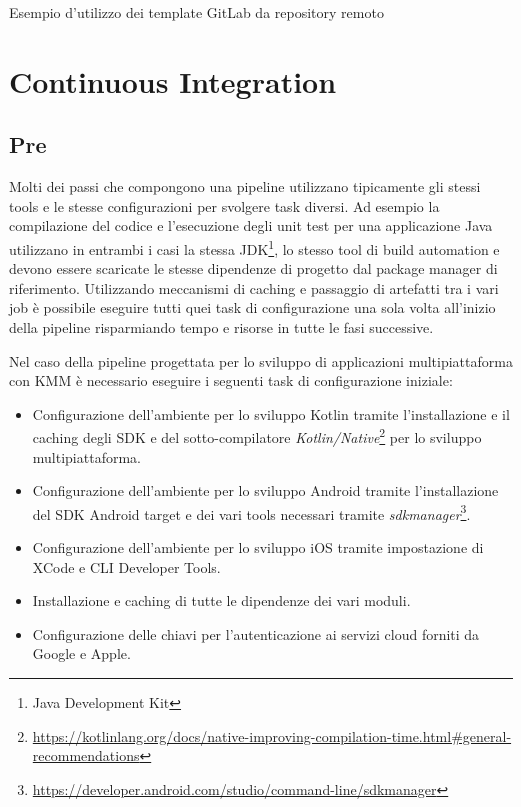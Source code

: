 \begin{listing}[H]
    \inputminted{yaml}{code/template-usage.yaml}
    \caption{Esempio d'utilizzo dei template GitLab da repository remoto}
\end{listing}

\section{Continuous Integration}
\subsection{Pre}
Molti dei passi che compongono una pipeline utilizzano tipicamente gli stessi tools e le stesse configurazioni per svolgere task diversi. Ad esempio la compilazione del codice e l'esecuzione degli unit test per una applicazione Java utilizzano in entrambi i casi la stessa JDK\footnote{Java Development Kit}, lo stesso tool di build automation e devono essere scaricate le stesse dipendenze di progetto dal package manager di riferimento. Utilizzando meccanismi di caching e passaggio di artefatti tra i vari job è possibile eseguire tutti quei task di configurazione una sola volta all'inizio della pipeline risparmiando tempo e risorse in tutte le fasi successive.

Nel caso della pipeline progettata per lo sviluppo di applicazioni multipiattaforma con KMM è necessario eseguire i seguenti task di configurazione iniziale:
\begin{itemize}
    \item Configurazione dell'ambiente per lo sviluppo Kotlin tramite l'installazione e il caching degli SDK e del sotto-compilatore \textit{Kotlin/Native}\footnote{\href{https://kotlinlang.org/docs/native-improving-compilation-time.html\#general-recommendations}{https://kotlinlang.org/docs/native-improving-compilation-time.html\#general-recommendations}} per lo sviluppo multipiattaforma.
    \item Configurazione dell'ambiente per lo sviluppo Android tramite l'installazione del SDK Android target e dei vari tools necessari tramite \textit{sdkmanager}\footnote{\href{https://developer.android.com/studio/command-line/sdkmanager}{https://developer.android.com/studio/command-line/sdkmanager}}.
    \item Configurazione dell'ambiente per lo sviluppo iOS tramite impostazione di XCode e CLI Developer Tools.
    \item Installazione e caching di tutte le dipendenze dei vari moduli.
    \item Configurazione delle chiavi per l'autenticazione ai servizi cloud forniti da Google e Apple.
\end{itemize}

